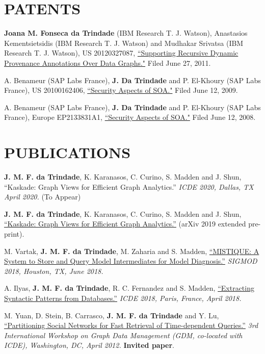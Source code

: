 \documentclass[line,margin]{res}
\begin{document}
\begin{resume}
\section{PATENTS}  \textbf{Joana M. Fonseca da Trindade} (IBM Research T. J. Watson), Anastasios Kementsietsidis (IBM Research T. J. Watson) and Mudhakar Srivatsa (IBM Research T. J. Watson), US 20120327087, \href{http://www.faqs.org/patents/app/20120327087}{``Supporting Recursive Dynamic Provenance Annotations Over Data Graphs."} Filed June 27, 2011.

A. Benameur (SAP Labs France), \textbf{J. Da Trindade} and P. El-Khoury (SAP Labs France), US 20100162406, \href{http://www.faqs.org/patents/app/20100162406}{``Security Aspects of SOA."}  Filed June 12, 2009.

A. Benameur (SAP Labs France), \textbf{J. Da Trindade} and P. El-Khoury (SAP Labs France), Europe EP2133831A1, \href{http://www.freepatentsonline.com/EP2133831B1.html}{``Security Aspects of SOA."}  Filed June 12, 2008.

\section{PUBLICATIONS}
\textbf{J. M. F. da Trindade}, K. Karanasos, C. Curino, S. Madden and J. Shun, ``Kaskade: Graph Views for Efficient Graph Analytics.'' \textit{ICDE 2020, Dallas, TX April 2020.} (To Appear)

\textbf{J. M. F. da Trindade}, K. Karanasos, C. Curino, S. Madden and J. Shun, \href{https://arxiv.org/abs/1906.05162}{``Kaskade: Graph Views for Efficient Graph Analytics.''} (arXiv 2019 extended pre-print).

M. Vartak, \textbf{J. M. F. da Trindade}, M. Zaharia and S. Madden, \href{https://cs.stanford.edu/~matei/papers/2018/sigmod_mistique.pdf}{``MISTIQUE: A System to Store and Query Model Intermediates for Model Diagnosis.''} \textit{SIGMOD 2018, Houston, TX, June 2018.}

A. Ilyas, \textbf{J. M. F. da Trindade}, R. C. Fernandez and S. Madden, \href{https://arxiv.org/pdf/1710.11528.pdf}{``Extracting Syntactic Patterns from Databases.''} \textit{ICDE 2018, Paris, France, April 2018.}

M. Yuan, D. Stein, B. Carrasco, \textbf{J. M. F. da Trindade} and Y. Lu, \href{http://joanatrindade.wdfiles.com/local--files/curriculum/gdm2012-paper.pdf}{``Partitioning Social Networks for Fast Retrieval of Time-dependent Queries.''} \textit{3rd International Workshop on Graph Data Management (GDM, co-located with ICDE), Washington, DC, April 2012.} \textbf{Invited paper}.


\end{resume}
\end{document}
